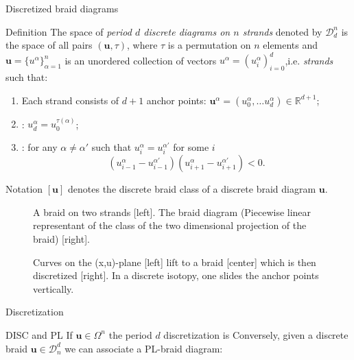 \documentclass[9pt, english]{beamer}
\theoremstyle{definition}
\newcommand{\simbolovettore}[1]{{\boldsymbol{#1}}}
\newcommand{\vu}{\simbolovettore{u}}
\newcommand{\R}{\mathbb{R}}                     %
\begin{document}
\begin{frame}{Discretized braid diagrams}
    \begin{block}{Definition}
        The space of {\em period $d$ discrete diagrams on $n$ strands\/}
        denoted by $\mathscr D_d^n$ is the space of all pairs $(\vu,
        \tau)$, \pause where $\tau$ is a permutation on $n$ elements \pause and
        $\vu=\{u^\alpha\}_{\alpha=1}^n$ is an unordered collection of
        vectors $u^\alpha=(u_i^\alpha)_{i=0}^d$,\pause i.e. {\em strands\/}
        such that:
        \begin{enumerate}
        \item Each strand consists of $d+1$ anchor points: $\vu^\alpha=(u_0^\alpha, \dots u_d^\alpha)\in
        \R^{d+1}$;\pause
        \item {\color{red}{(Periodicity)}\/}: $u_d^\alpha= u_0^{\tau(\alpha)}$;\pause
        \item {\color{red}{(Transversality)}\/}: for any $\alpha\neq \alpha'$ such
        that $u_i^\alpha=u_i^{\alpha'}$ for some $i$
        \[
        (u_{i-1}^\alpha - u_{i-1}^{\alpha'})(u_{i+1}^\alpha-
        u_{i+1}^{\alpha'})<0.
        \]
        \end{enumerate}
        \end{block}
\end{frame}
\begin{frame}
        \begin{block}{Notation}
            $[\vu]$ denotes the discrete braid class of a discrete braid
            diagram $\vu$.
        \end{block}
       \begin{figure}\label{fig:PLdiagram}
        \caption{A braid on two strands [left]. The braid diagram
        (Piecewise linear representant of the class of the two dimensional projection of the
        braid) [right].}
        \end{figure}
\end{frame}
\begin{frame}
        \begin{figure}\label{fig:fig1Inve}
        \caption{Curves on the (x,u)-plane [left] lift to a braid [center]
        which is then discretized [right]. In a discrete isotopy, one slides the anchor points vertically.}
        \end{figure}
\end{frame}
\begin{frame}{Discretization}
    \begin{block}{DISC and PL}
        If $\vu \in \Omega^n$ the period $d$ discretization is
        {\color{blue}{
        \[
        DISC_d(\vu):={u^\alpha(i/d)}_i^\alpha
        \]}\/}
        \pause
        Conversely, given a discrete braid $\vu\in \mathscr D_n^d$ we
        can associate a PL-braid diagram:\pause
        {\color{red}{
        \[
        PL(u^\alpha)(x):=u^\alpha_{\lfloor d\cdot x\rfloor}+ (d\cdot x-\lfloor d\cdot
        x\rfloor)(u^\alpha_{\lceil d\cdot x\rceil}-u^\alpha_{\lfloor d\cdot x\rfloor}).
        \]}\/}
    \end{block}
\end{frame}
\end{document}
